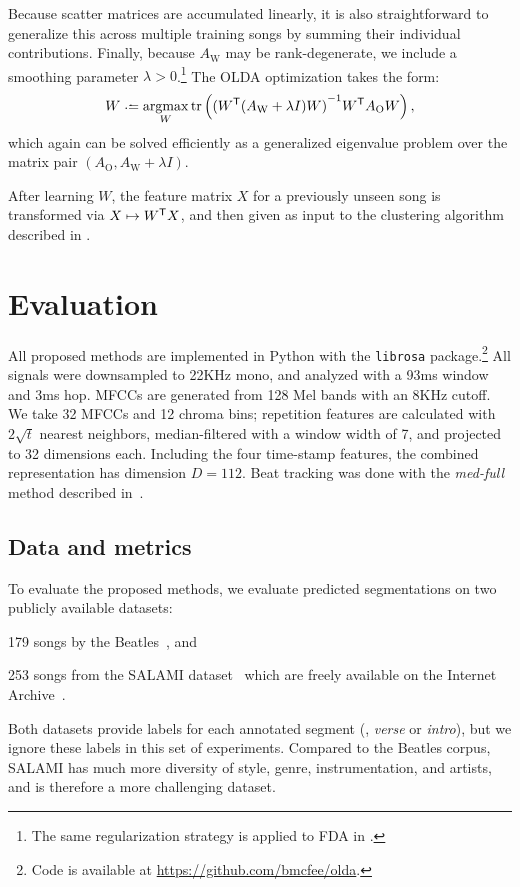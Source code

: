 \documentclass{article}
\begin{document}
Because scatter matrices are accumulated linearly, it is also straightforward to generalize this across multiple training songs
by summing their individual contributions.  Finally, because $A_\text{W}$ may be rank-degenerate, we include a smoothing parameter
$\lambda > 0$.\footnote{The same regularization strategy is applied to FDA in .} 
The OLDA optimization takes the form:
\begin{equation}
W \defeq \argmax_W \trace\left( {(W\trans (A_\text{W} + \lambda I) W)}^{-1} W\trans A_\text{O} W \right) \label{eq:olda},
\end{equation}
which again can be solved efficiently as a generalized eigenvalue problem over the matrix pair 
$(A_\text{O}, A_\text{W} + \lambda I)$.

After learning $W$, the feature matrix $X$ for a previously unseen song is transformed via $X \mapsto W^\mathsf{T} X$, and then 
given as input to the clustering algorithm described in .

\section{Evaluation}
\label{sec:eval}
All proposed methods are implemented in Python with the \texttt{librosa} package.\footnote{Code is
available at \url{https://github.com/bmcfee/olda}.}  
All signals were downsampled to 22KHz mono, and analyzed with a 93ms window and 3ms hop.  MFCCs are generated from 128 Mel bands
with an 8KHz cutoff. We take 32 MFCCs and 12 chroma bins; repetition features are calculated with $2\sqrt{t}$ nearest neighbors,
median-filtered with a window width of 7, and projected to 32 dimensions each.  Including the four time-stamp features, the combined
representation has dimension $D=112$. Beat tracking was done with the \emph{med-full} method described in~\cite{mcfee2014beat}.

\subsection{Data and metrics}
To evaluate the proposed methods, we evaluate predicted segmentations on two publicly available datasets:
\begin{description}\addtolength{\itemsep}{-0.25\baselineskip}%
\item[Beatles-ISO] 179 songs by the Beatles~\cite{harte2010towards,isophonicsbeatles}, and
\item[SALAMI-free] 253 songs from the SALAMI dataset~\cite{smith2011design} which are freely available on the 
Internet Archive~\cite{nieto2013convex}.
\end{description}
Both datasets provide labels for each annotated segment (\eg, \emph{verse} or \emph{intro}), but we ignore these
labels in this set of experiments. Compared to the Beatles corpus, SALAMI has much more diversity of style, genre, 
instrumentation, and artists, and is therefore a more challenging dataset.
\end{document}
